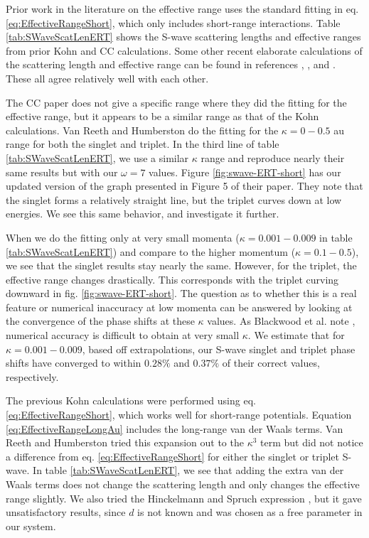 \documentclass[preprint,showpacs,preprintnumbers,amsmath,amssymb]{revtex4}
\begin{document}
Prior work in the literature \cite{Blackwood2002,Walters2004,VanReeth2003} on the effective range uses the standard fitting in eq. \ref{eq:EffectiveRangeShort}, which only includes short-range interactions. Table \ref{tab:SWaveScatLenERT} shows the S-wave scattering lengths and effective ranges from prior Kohn \cite{VanReeth2003} and CC \cite{Blackwood2002,Walters2004} calculations. Some other recent elaborate calculations of the scattering length and effective range can be found in references \cite{Sinha2000}, \cite{Chiesa2002}, and \cite{Ivanov2002}. These all agree relatively well with each other.

The CC paper \cite{Blackwood2002} does not give a specific range where they did the fitting for the effective range, but it appears to be a similar range as that of the Kohn calculations. Van Reeth and Humberston \cite{VanReeth2003} do the fitting for the $\kappa = 0-0.5$ au range for both the singlet and triplet. In the third line of table \ref{tab:SWaveScatLenERT}, we use a similar $\kappa$ range and reproduce nearly their same results but with our $\omega = 7$ values. Figure \ref{fig:swave-ERT-short} has our updated version of the graph presented in Figure 5 of their paper. They note that the singlet forms a relatively straight line, but the triplet curves down at low energies. We see this same behavior, and investigate it further.

When we do the fitting only at very small momenta ($\kappa = 0.001 - 0.009$ in table \ref{tab:SWaveScatLenERT}) and compare to the higher momentum ($\kappa = 0.1 - 0.5$), we see that the singlet results stay nearly the same. However, for the triplet, the effective range changes drastically. This corresponds with the triplet curving downward in fig. \ref{fig:swave-ERT-short}. The question as to whether this is a real feature or numerical inaccuracy at low momenta can be answered by looking at the convergence of the phase shifts at these $\kappa$ values. As Blackwood et al. note \cite{Blackwood2002}, numerical accuracy is difficult to obtain at very small $\kappa$. We estimate that for $\kappa = 0.001 - 0.009$, based off extrapolations, our S-wave singlet and triplet phase shifts have converged to within $0.28\%$ and $0.37\%$ of their correct values, respectively.

The previous Kohn calculations \cite{VanReeth2003} were performed using eq. \ref{eq:EffectiveRangeShort}, which works well for short-range potentials. Equation \ref{eq:EffectiveRangeLongAu} includes the long-range van der Waals terms. Van Reeth and Humberston \cite{VanReeth2003} tried this expansion out to the $\kappa^3$ term but did not notice a difference from eq. \ref{eq:EffectiveRangeShort} for either the singlet or triplet S-wave. In table \ref{tab:SWaveScatLenERT}, we see that adding the extra van der Waals terms does not change the scattering length and only changes the effective range slightly. We also tried the Hinckelmann and Spruch expression \cite{Hinckelmann1971}, but it gave unsatisfactory results, since $d$ is not known and was chosen as a free parameter in our system.
\end{document}
